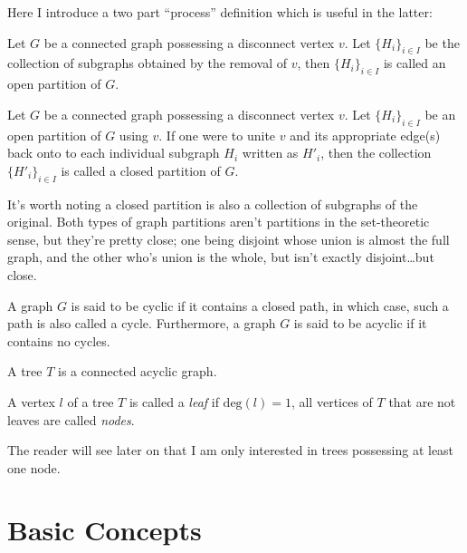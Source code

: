 \documentclass[twoside]{article}
\newenvironment{definition}[1][Definition]{\begin{trivlist}
\item[\hskip \labelsep {\bfseries #1}]}{\end{trivlist}}
\begin{document}
Here I introduce a two part ``process'' definition which is useful in the latter:

\begin{definition}[Open Partition]

Let $ G $ be a connected graph possessing a disconnect vertex $ v $.  Let $ \{H_i\}_{i\in I} $ be the collection
of subgraphs obtained by the removal of $ v $, then $ \{H_i\}_{i\in I} $ is called an open partition of $ G $.

\end{definition}

\begin{definition}[Closed Partition]

Let $ G $ be a connected graph possessing a disconnect vertex $ v $.  Let $ \{H_i\}_{i\in I} $ be an open partition
of $ G $ using $ v $.  If one were to unite $ v $ and its appropriate edge(s) back onto to each individual subgraph
$ H_i $ written as $ H'_i $, then the collection $ \{H'_i\}_{i\in I} $ is called a closed partition of $ G $.

\end{definition}

It's worth noting a closed partition is also a collection of subgraphs of the original.  Both types of graph
partitions aren't partitions in the set-theoretic sense, but they're pretty close; one being disjoint whose union
is almost the full graph, and the other who's union is the whole, but isn't exactly disjoint\ldots but close.

\begin{definition}[Cyclic Graph]

A graph $ G $ is said to be cyclic if it contains a closed path, in which case, such a path is also called a cycle.
Furthermore, a graph $ G $ is said to be acyclic if it contains no cycles.

\end{definition}

\begin{definition}[Tree]

A tree $ T $ is a connected acyclic graph.

\end{definition}
A vertex $ l $ of a tree $ T $ is called a \emph{leaf} if $ \mbox{deg}(l)=1 $,
all vertices of $ T $ that are not leaves are called \emph{nodes}.

The reader will see later on that I am only interested in trees possessing at least one node.

\section{Basic Concepts}
\end{document}
